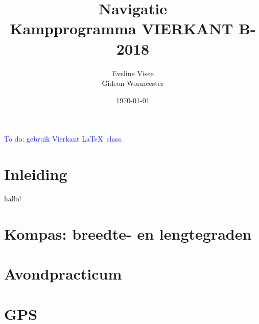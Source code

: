 \documentclass[a4paper,10pt]{article}
\title{Navigatie \\ Kampprogramma VIERKANT B-2018}
\author{Eveline Visee \\ Gideon Wormeester}
\date{\today}
\begin{document}
\maketitle

\textcolor{blue}{To do: gebruik Vierkant \LaTeX\ class.}
\section*{Inleiding}
hallo!



\section{Kompas: breedte- en lengtegraden}



\section{Avondpracticum}

\section{GPS}
\end{document}
